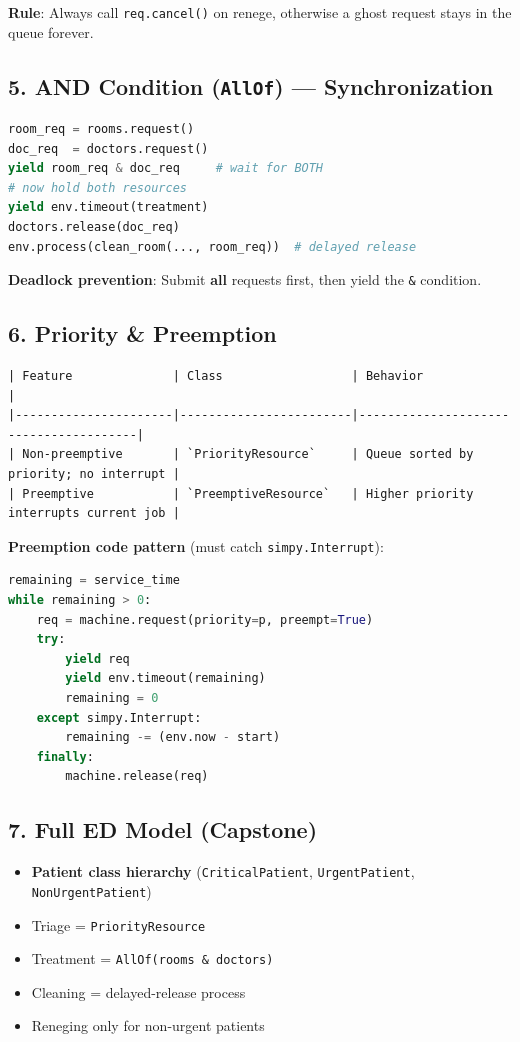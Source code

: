 \documentclass[11pt]{article}
\begin{document}
\textbf{Rule}: Always call \texttt{req.cancel()} on renege, otherwise a ghost request stays in the queue forever.

\subsection*{5. AND Condition (\texttt{AllOf}) --- Synchronization}
\begin{lstlisting}[language=Python]
room_req = rooms.request()
doc_req  = doctors.request()
yield room_req & doc_req     # wait for BOTH
# now hold both resources
yield env.timeout(treatment)
doctors.release(doc_req)
env.process(clean_room(..., room_req))  # delayed release
\end{lstlisting}

\textbf{Deadlock prevention}: Submit \textbf{all} requests first, then yield the \texttt{\&} condition.

\subsection*{6. Priority \& Preemption}
\begin{verbatim}
| Feature              | Class                  | Behavior                              |
|----------------------|------------------------|---------------------------------------|
| Non-preemptive       | `PriorityResource`     | Queue sorted by priority; no interrupt |
| Preemptive           | `PreemptiveResource`   | Higher priority interrupts current job |
\end{verbatim}

\textbf{Preemption code pattern} (must catch \texttt{simpy.Interrupt}):
\begin{lstlisting}[language=Python]
remaining = service_time
while remaining > 0:
    req = machine.request(priority=p, preempt=True)
    try:
        yield req
        yield env.timeout(remaining)
        remaining = 0
    except simpy.Interrupt:
        remaining -= (env.now - start)
    finally:
        machine.release(req)
\end{lstlisting}

\subsection*{7. Full ED Model (Capstone)}
\begin{itemize}[leftmargin=*]
\item \textbf{Patient class hierarchy} (\texttt{CriticalPatient}, \texttt{UrgentPatient}, \texttt{NonUrgentPatient})
\item Triage = \texttt{PriorityResource}
\item Treatment = \texttt{AllOf(rooms \& doctors)}
\item Cleaning = delayed-release process
\item Reneging only for non-urgent patients
\end{itemize}
\end{document}
